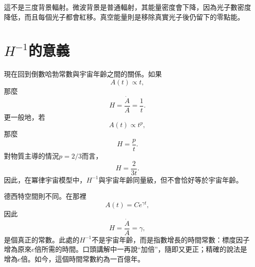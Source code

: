 \begin{classroomqa}
\end{classroomqa}

這不是三度背景輻射。微波背景是普通輻射，其能量密度會下降，因為光子數密度降低，而且每個光子都會紅移。真空能量則是移除真實光子後仍留下的零點能。

\section{\(H^{-1}\)的意義}

現在回到倒數哈勃常數與宇宙年齡之間的關係。如果
\begin{equation}
A(t)\propto t,
\end{equation}
那麼
\begin{equation}
H=\frac{\dot A}{A}=\frac{1}{t}.
\end{equation}
更一般地，若
\begin{equation}
A(t)\propto t^p,
\end{equation}
那麼
\begin{equation}
H=\frac{p}{t}.
\end{equation}
對物質主導的情況\(p=2/3\)而言，
\begin{equation}
H=\frac{2}{3t}.
\end{equation}
因此，在冪律宇宙模型中，\(H^{-1}\)與宇宙年齡同量級，但不會恰好等於宇宙年齡。

德西特空間則不同。在那裡
\begin{equation}
A(t)=C e^{\gamma t},
\end{equation}
因此
\begin{equation}
H=\frac{\dot A}{A}=\gamma,
\end{equation}
是個真正的常數。此處的\(H^{-1}\)不是宇宙年齡，而是指數增長的時間常數：標度因子增為原來\(e\)倍所需的時間。口頭講解中一再說``加倍''，隨即又更正；精確的說法是增為\(e\)倍。如今，這個時間常數約為一百億年。

\begin{classroomqa}
\end{classroomqa}

